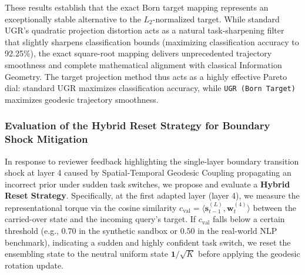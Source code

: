 These results establish that the exact Born target mapping represents an exceptionally stable alternative to the $L_2$-normalized target. While standard UGR's quadratic projection distortion acts as a natural task-sharpening filter that slightly sharpens classification bounds (maximizing classification accuracy to 92.25\%), the exact square-root mapping delivers unprecedented trajectory smoothness and complete mathematical alignment with classical Information Geometry. The target projection method thus acts as a highly effective Pareto dial: standard UGR maximizes classification accuracy, while \texttt{UGR (Born Target)} maximizes geodesic trajectory smoothness.

\subsubsection{Evaluation of the Hybrid Reset Strategy for Boundary Shock Mitigation}
In response to reviewer feedback highlighting the single-layer boundary transition shock at layer 4 caused by Spatial-Temporal Geodesic Coupling propagating an incorrect prior under sudden task switches, we propose and evaluate a \textbf{Hybrid Reset Strategy}. Specifically, at the first adapted layer (layer 4), we measure the representational torque via the cosine similarity $c_{\text{val}} = \langle \mathbf{s}_{t-1}^{(L)}, \mathbf{w}_t^{(4)} \rangle$ between the carried-over state and the incoming query's target. If $c_{\text{val}}$ falls below a certain threshold (e.g., $0.70$ in the synthetic sandbox or $0.50$ in the real-world NLP benchmark), indicating a sudden and highly confident task switch, we reset the ensembling state to the neutral uniform state $\mathbf{1}/\sqrt{K}$ before applying the geodesic rotation update. 

